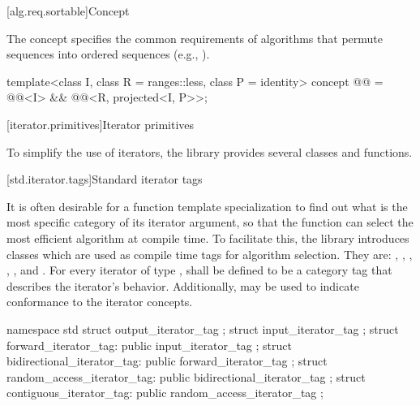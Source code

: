 [alg.req.sortable]{Concept }

\pnum
The  concept specifies the common requirements of
algorithms that permute sequences into ordered sequences (e.g., ).

\begin{codeblock}
template<class I, class R = ranges::less, class P = identity>
  concept @@ =
    @@<I> &&
    @@<R, projected<I, P>>;
\end{codeblock}

[iterator.primitives]{Iterator primitives}

\pnum
To simplify the use of iterators, the library provides
several classes and functions.

[std.iterator.tags]{Standard iterator tags}

\pnum
{}%
%
%
%
%
%
It is often desirable for a
function template specialization
to find out what is the most specific category of its iterator
argument, so that the function can select the most efficient algorithm at compile time.
To facilitate this, the
library introduces
classes which are used as compile time tags for algorithm selection.
They are:
,
,
,
,
,
and
.
For every iterator of type
,
shall be defined to be a category tag that describes the
iterator's behavior.
Additionally,
may be used to indicate conformance to
the iterator concepts.

\begin{codeblock}
namespace std {
  struct output_iterator_tag { };
  struct input_iterator_tag { };
  struct forward_iterator_tag: public input_iterator_tag { };
  struct bidirectional_iterator_tag: public forward_iterator_tag { };
  struct random_access_iterator_tag: public bidirectional_iterator_tag { };
  struct contiguous_iterator_tag: public random_access_iterator_tag { };
}
\end{codeblock}

